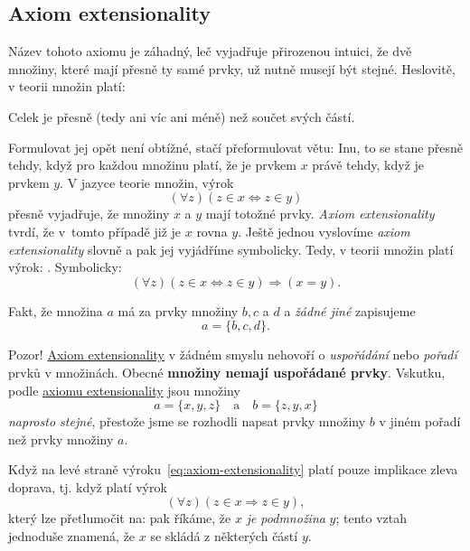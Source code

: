 \subsection{Axiom extensionality}
\label{ssec:axiom-extensionality}

Název tohoto axiomu je záhadný, leč vyjadřuje přirozenou intuici, že dvě
množiny, které mají přesně ty samé prvky, už nutně musejí být stejné. Heslovitě,
v teorii množin platí:
\begin{highlightBox}
  \alert{Celek je přesně (tedy ani víc ani méně) než součet svých částí.}
\end{highlightBox}
Formulovat jej opět není obtížné, stačí přeformulovat větu:  Inu, to se stane přesně tehdy, když pro každou množinu
platí, že je prvkem $x$ právě tehdy, když je prvkem $y$. V jazyce teorie množin,
výrok
\[
  ( \forall z)(z \in x \Leftrightarrow z \in y)
\]
přesně vyjadřuje, že množiny $x$ a $y$ mají totožné prvky. \emph{Axiom
extensionality} tvrdí, že v~tomto případě již je $x$ rovna $y$. Ještě jednou
vyslovíme \emph{axiom extensionality} slovně a pak jej vyjádříme symbolicky.
Tedy, v teorii množin platí výrok: . Symbolicky:
\begin{equation}
  \label{eq:axiom-extensionality}
  ( \forall z)(z \in x \Leftrightarrow z \in y) \Rightarrow (x = y).
\end{equation}
\begin{notation}
  Fakt, že množina $a$ má za prvky množiny $b, c$ a $d$ a \emph{žádné jiné}
  zapisujeme
  \[
    a = \{b, c, d\}.
  \]
\end{notation}
\begin{warning}
  Pozor! \hyperref[ssec:axiom-extensionality]{Axiom extensionality} v žádném
  smyslu nehovoří o \emph{uspořádání} nebo \emph{pořadí} prvků v množinách.
  Obecné \textbf{množiny nemají uspořádané prvky}. Vskutku, podle
  \hyperref[ssec:axiom-extensionality]{axiomu extensionality} jsou množiny
  \[
    a = \{x, y, z\} \quad \text{a} \quad b = \{z, y, x\}
  \]
  \emph{naprosto stejné}, přestože jsme se rozhodli napsat prvky množiny $b$ v
  jiném pořadí než prvky množiny $a$.
\end{warning}

Když na levé straně výroku~\eqref{eq:axiom-extensionality} platí pouze implikace
zleva doprava, tj. když platí výrok
\[
  ( \forall z)(z \in x \Rightarrow z \in y),
\]
který lze přetlumočit na:  pak říkáme, že $x$ \emph{je podmnožina} $y$; tento vztah jednoduše
znamená, že $x$ se skládá z některých částí $y$.


